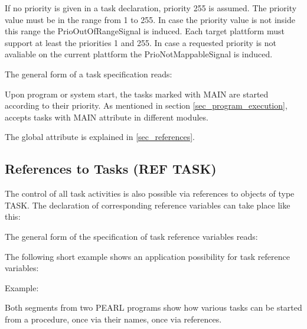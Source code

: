 If no priority is given in a task declaration, priority 255 is assumed.
The priority value must be in the range from 1 to 255. 
In case the priority value is not inside this range the PrioOutOfRangeSignal
is induced.
Each target plattform must support at least the priorities 1 and 255.
In case a requested priority is not avaliable on the current plattform
the PrioNotMappableSignal is induced.


The general form of a task specification reads:




Upon program or system start, the tasks marked with MAIN are started
according to their priority. 
As mentioned in section \ref{sec_program_execution}, \OpenPEARL{} 
accepts tasks with MAIN attribute in different modules.

The global attribute is explained in \ref{sec_references}.

\subsection{References to Tasks (REF TASK)}   %
\label{sec_ref_task}

The control of all task activities is also possible via references to
objects of type TASK. The declaration of corresponding reference
variables can take place like this:



The general form of the specification of task reference variables reads:



The following short example shows an application possibility for task
reference variables:

Example:

Both segments from two PEARL programs show how various tasks can be
started from a procedure, once via their names, once via references.

